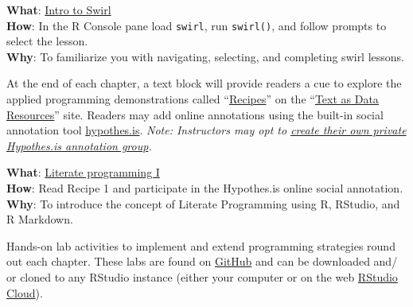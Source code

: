 \documentclass[
  letterpaper,
]{latex/krantz}
\begin{document}
\begin{tcolorbox}[enhanced jigsaw, opacitybacktitle=0.6, breakable, colframe=quarto-callout-tip-color-frame, arc=.35mm, left=2mm, leftrule=.75mm, title=\textcolor{quarto-callout-tip-color}{\faLightbulb}\hspace{0.5em}{Swirl}, opacityback=0, colback=white, toptitle=1mm, rightrule=.15mm, titlerule=0mm, bottomtitle=1mm, bottomrule=.15mm, coltitle=black, colbacktitle=quarto-callout-tip-color!10!white, toprule=.15mm]
\textbf{What}: \href{https://github.com/lin380/swirl}{Intro to Swirl}\\
\textbf{How}: In the R Console pane load \texttt{swirl}, run
\texttt{swirl()}, and follow prompts to select the lesson.\\
\textbf{Why}: To familiarize you with navigating, selecting, and
completing swirl lessons.
\end{tcolorbox}

At the end of each chapter, a text block will provide readers a cue to
explore the applied programming demonstrations called
``\href{https://lin380.github.io/tadr/articles/}{Recipes}'' on the
``\href{https://lin380.github.io/tadr}{Text as Data Resources}'' site.
Readers may add online annotations using the built-in social annotation
tool
\href{https://web.hypothes.is/education/annotated/research/}{hypothes.is}.
\emph{Note: Instructors may opt to
\href{https://web.hypothes.is/creating-groups/}{create their own private
Hypothes.is annotation group}.}

\begin{tcolorbox}[enhanced jigsaw, opacitybacktitle=0.6, breakable, colframe=quarto-callout-tip-color-frame, arc=.35mm, left=2mm, leftrule=.75mm, title=\textcolor{quarto-callout-tip-color}{\faLightbulb}\hspace{0.5em}{Recipe}, opacityback=0, colback=white, toptitle=1mm, rightrule=.15mm, titlerule=0mm, bottomtitle=1mm, bottomrule=.15mm, coltitle=black, colbacktitle=quarto-callout-tip-color!10!white, toprule=.15mm]
\textbf{What}:
\href{https://lin380.github.io/tadr/articles/recipe_1.html}{Literate
programming I}\\
\textbf{How}: Read Recipe 1 and participate in the Hypothes.is online
social annotation.\\
\textbf{Why}: To introduce the concept of Literate Programming using R,
RStudio, and R Markdown.
\end{tcolorbox}

Hands-on lab activities to implement and extend programming strategies
round out each chapter. These labs are found on
\href{https://github.com/lin380?q=lab\&type=all\&language=\&sort=name}{GitHub}
and can be downloaded and/ or cloned to any RStudio instance (either
your computer or on the web
\href{https://www.rstudio.com/products/cloud/}{RStudio Cloud}).
\end{document}
